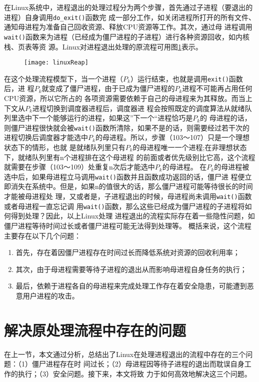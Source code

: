\documentclass{swfuthesism}
\begin{document}
在Linux系统中，进程退出的处理过程分为两个步骤，首先通过子进程（要退出的进程）自身调用\texttt{do\_exit()}函数完
成一部分工作，如关闭进程所打开的所有文件、通知母进程为准备自己回收资源、释放CPU资源等工作。其次，通过母
进程调用\texttt{wait()}函数来为进程（已经成为僵尸进程的子进程）进行各种资源回收，如内核栈、页表等资
源。Linux对进程退出处理的原流程可用图\ref{fig:workflow-current}表示。

\begin{figure}
  \centering
  \texttt{[image: linuxReap]}
  \label{fig:workflow-current}
\end{figure}

在这个处理流程模型下，当一个进程（$P_k$）运行结束，也就是调用\texttt{exit()}函数后，进
程$P_k$就变成了僵尸进程，由于已成为僵尸进程的$P_k$进程不可能再占用任何CPU资源，所以它所占的
各项资源需要依赖于自己的母进程来为其释放。而当上下文从$P_k$进程切换到调度器进程后，调度器进
程会按照既定的调度算法从就绪队列里选中下一个能够运行的进程，如果这”下一个“进程恰巧是$P_k$的
母进程的话，则僵尸进程很快就会被\texttt{wait()}函数所清除，如果不是的话，则需要经过若干次的
进程切换后调度器才能选中$P_k$的母进程。所以，步骤（103～107）只是一个理想状态下的情形，也就
是就绪队列里只有$P_k$的母进程唯一一个进程;在非理想状态下，就绪队列里有n个进程排在这个母进程
的前面或者优先级别比它高，这个流程就需要在步骤（103～109）处重复n次后才能选中$P_k$的母进程。
在$P_k$的母进程被选中后，如果母进程立马调用\texttt{wait()}函数并且函数成功返回的话，僵尸进
程便立即消失在系统中。但是，如果n的值很大的话，那么僵尸进程可能等待很长的时间才能被母进程处
理，又或者是，子进程退出的时候，母进程尚未调用\texttt{wait()}函数或者母进程一直忘记调
用\texttt{wait()}函数，那么这些已经成为僵尸进程的子进程将如何得到处理？因此，以上Linux处理
进程退出的流程实际存在着一些隐性问题，如僵尸进程等待时间过长或者僵尸进程可能无法得到处理等。
概括来说，这个流程主要存在以下几个问题：

\begin{enumerate}
\item 首先，存在着因僵尸进程存在时间过长而降低系统对资源的回收利用率；
\item 其次，由于母进程需要等待子进程的退出从而影响母进程自身任务的执行；
\item 最后，依赖于进程各自的母进程来完成处理工作存在着安全隐患，可能遭到恶意用户进程的攻击。
\end{enumerate}

\section{解决原处理流程中存在的问题}
\label{sec:solution}
在上一节，本文通过分析，总结出了Linux在处理进程退出的流程中存在的三个问题：（1）僵尸进程存在时
间过长；（2）母进程因等待子进程的退出而耽误自身工作的执行；（3）安全问题。接下来，本文将致
力于如何高效地解决这三个问题。
\end{document}
